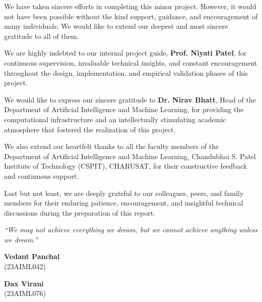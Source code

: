 \documentclass[12pt,a4paper]{report}
\numberwithin{equation}{section}
\begin{document}
We have taken sincere efforts in completing this minor project. However, it would not have been possible without the kind support, guidance, and encouragement of many individuals. We would like to extend our deepest and most sincere gratitude to all of them.

\vspace{0.3cm}
We are highly indebted to our internal project guide, \textbf{Prof. Niyati Patel}, for continuous supervision, invaluable technical insights, and constant encouragement throughout the design, implementation, and empirical validation phases of this project.

\vspace{0.3cm}
We would like to express our sincere gratitude to \textbf{Dr. Nirav Bhatt}, Head of the Department of Artificial Intelligence and Machine Learning, for providing the computational infrastructure and an intellectually stimulating academic atmosphere that fostered the realization of this project.

\vspace{0.3cm}
We also extend our heartfelt thanks to all the faculty members of the Department of Artificial Intelligence and Machine Learning, Chandubhai S. Patel Institute of Technology (CSPIT), CHARUSAT, for their constructive feedback and continuous support.

\vspace{0.3cm}
Last but not least, we are deeply grateful to our colleagues, peers, and family members for their enduring patience, encouragement, and insightful technical discussions during the preparation of this report.

\vspace{1.0cm}
\begin{center}
    \textit{``We may not achieve everything we dream, but we cannot achieve anything unless we dream.''}
\end{center}

\vspace{0.8cm}
\noindent
\begin{minipage}[t]{0.48\textwidth}
    \textbf{Vedant Panchal}\\
    (23AIML042)
\end{minipage}
\hfill
\begin{minipage}[t]{0.48\textwidth}
    \begin{flushright}
        \textbf{Dax Virani}\\
        (23AIML076)
    \end{flushright}
\end{minipage}
\end{document}
